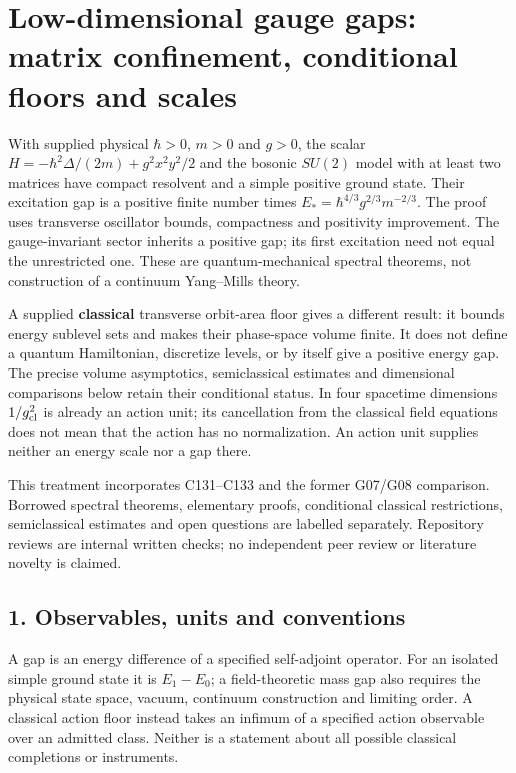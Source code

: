 \documentclass[11pt,a4paper]{article}
\begin{document}
\hypertarget{low-dimensional-gauge-gaps-matrix-confinement-conditional-floors-and-scales}{%
\section{Low-dimensional gauge gaps: matrix confinement, conditional
floors and
scales}\label{low-dimensional-gauge-gaps-matrix-confinement-conditional-floors-and-scales}}

With supplied physical \(\hbar>0\), \(m>0\) and \(g>0\), the scalar
\(H=-\hbar^2\Delta/(2m)+g^2x^2y^2/2\) and the bosonic \(SU(2)\) model
with at least two matrices have compact resolvent and a simple positive
ground state. Their excitation gap is a positive finite number times
\({E_*} =\hbar^{4/3}g^{2/3}m^{-2/3}\). The proof uses transverse
oscillator bounds, compactness and positivity improvement. The
gauge-invariant sector inherits a positive gap; its first excitation
need not equal the unrestricted one. These are quantum-mechanical
spectral theorems, not construction of a continuum Yang--Mills theory.

A supplied \textbf{classical} transverse orbit-area floor gives a
different result: it bounds energy sublevel sets and makes their
phase-space volume finite. It does not define a quantum Hamiltonian,
discretize levels, or by itself give a positive energy gap. The precise
volume asymptotics, semiclassical estimates and dimensional comparisons
below retain their conditional status. In four spacetime dimensions
\(1/g_{\rm cl}^2\) is already an action unit; its cancellation from the
classical field equations does not mean that the action has no
normalization. An action unit supplies neither an energy scale nor a gap
there.

This treatment incorporates C131--C133 and the former G07/G08
comparison. Borrowed spectral theorems, elementary proofs, conditional
classical restrictions, semiclassical estimates and open questions are
labelled separately. Repository reviews are internal written checks; no
independent peer review or literature novelty is claimed.

\hypertarget{observables-units-and-conventions}{%
\subsection{1. Observables, units and
conventions}\label{observables-units-and-conventions}}

A gap is an energy difference of a specified self-adjoint operator. For
an isolated simple ground state it is \(E_1-E_0\); a field-theoretic
mass gap also requires the physical state space, vacuum, continuum
construction and limiting order. A classical action floor instead takes
an infimum of a specified action observable over an admitted class.
Neither is a statement about all possible classical completions or
instruments.
\end{document}
